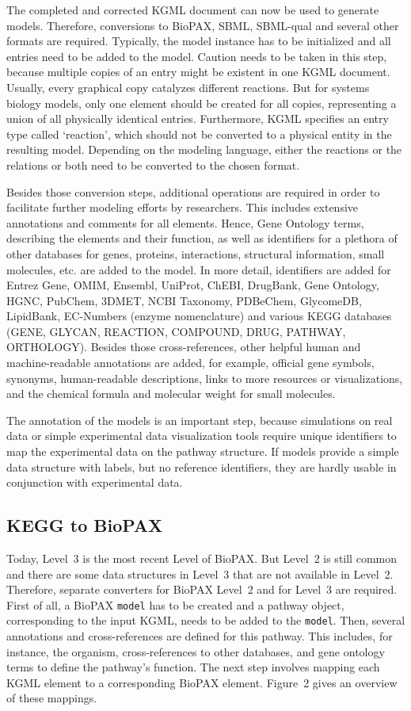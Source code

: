 \documentclass[10pt]{bmc_article}
\newenvironment{bmcformat}{\baselineskip20pt\sloppy\setboolean{publ}{false}}{\baselineskip20pt\sloppy}
\newcommand{\model}{\texttt{model}}
\begin{document}
\begin{bmcformat}
The completed and corrected KGML document can now be used to generate models. Therefore, conversions to BioPAX, SBML, SBML-qual and several other formats are required. Typically, the model instance has to be initialized and all entries need to be added to the model. Caution needs to be taken in this step, because multiple copies of an entry might be existent in one KGML document. Usually, every graphical copy catalyzes different reactions. But for systems biology models, only one element should be created for all copies, representing a union of all physically identical entries. Furthermore, KGML specifies an entry type called `reaction', which should not be converted to a physical entity in the resulting model.
Depending on the modeling language, either the reactions or the relations or both need to be converted to the chosen format.


Besides those conversion steps, additional operations are required in order to facilitate further modeling efforts by researchers. This includes extensive annotations and comments for all elements. Hence, Gene Ontology terms, describing the elements and their function, as well as identifiers for a plethora of other databases for genes, proteins, interactions, structural information, small molecules, etc. are added to the model. In more detail, identifiers are added for Entrez Gene, OMIM, Ensembl, UniProt, ChEBI, DrugBank, Gene Ontology, HGNC, PubChem, 3DMET, NCBI Taxonomy, PDBeChem, GlycomeDB, LipidBank, EC-Numbers (enzyme nomenclature) and various KEGG databases (\uppercase{gene, glycan, reaction, compound, drug, pathway, orthology}).
%
Besides those cross-references, other helpful human and machine-readable annotations are added, for example, official gene symbols, synonyms, human-readable descriptions, links to more resources or visualizations, and the chemical formula and molecular weight for small molecules.

The annotation of the models is an important step, because simulations on real data or simple experimental data visualization tools require unique identifiers to map the experimental data on the pathway structure. If models provide a simple data structure with labels, but no reference identifiers, they are hardly usable in conjunction with experimental data.


\subsection*{KEGG to BioPAX}

Today, Level~3 is the most recent Level of BioPAX. But Level~2 is still common and there are some data structures in Level~3 that are not available in Level~2. Therefore, separate converters for BioPAX Level~2 and for Level~3 are required. First of all, a BioPAX \model{} has to be created and a pathway object, corresponding to the input KGML, needs to be added to the \model. Then, several annotations and cross-references are defined for this pathway. This includes, for instance, the organism, cross-references to other databases, and gene ontology terms to define the pathway's function. The next step involves mapping each KGML element to a corresponding BioPAX element. Figure~2 gives an overview of these mappings.


\end{bmcformat}
\end{document}
